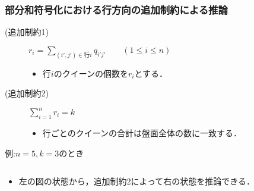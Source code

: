 \begin{frame}\frametitle{部分和符号化における行方向の追加制約による推論}
 \begin{block}{}
  \begin{description}
   \item[(追加制約1)] $r_{i}=\sum\limits_{(i',j')\in \mbox{行}i} 
	      q_{i'j'} \qquad (1 \leq i \leq n)$ 
	      \begin{itemize}
	       \item 行$i$のクイーンの個数を$r_i$とする．
	      \end{itemize}
   \item[(追加制約2)] $\sum\limits_{i=1}^{n}r_{i} = k$
	      \begin{itemize}
	       \item 行ごとのクイーンの合計は盤面全体の数に一致する．
	      \end{itemize}
  \end{description}
 \end{block}
 \begin{exampleblock}{例:$n=5,k=3$のとき}
  \begin{columns}
   \begin{column}{0.30\textwidth}
    \centering
    
   \end{column}
   \begin{column}{0.30\textwidth}
    \centering
    
   \end{column}
  \end{columns}
  \begin{itemize}
   \item 左の図の状態から，追加制約2によって右の状態を推論できる．
  \end{itemize}
 \end{exampleblock}
\end{frame}

